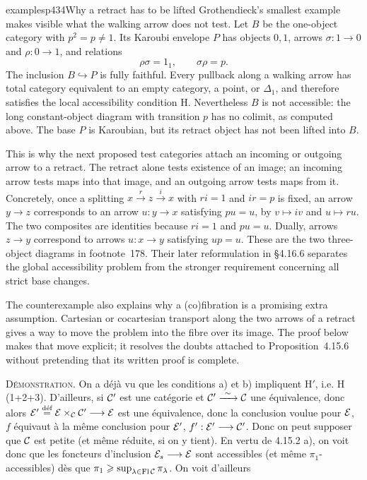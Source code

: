 \begin{dcomment}{examples}{p434}{Why a retract has to be lifted}
Grothendieck's smallest example makes visible what the walking arrow does not test. Let $B$ be the one-object category with $p^2=p\ne1$. Its Karoubi envelope $P$ has objects $0,1$, arrows $\sigma:1\to0$ and $\rho:0\to1$, and relations
\[
 \rho\sigma=1_1,\qquad\sigma\rho=p.
\]
The inclusion $B\hookrightarrow P$ is fully faithful. Every pullback along a walking arrow has total category equivalent to an empty category, a point, or $\Delta_1$, and therefore satisfies the local accessibility condition H. Nevertheless $B$ is not accessible: the long constant-object diagram with transition $p$ has no colimit, as computed above. The base $P$ is Karoubian, but its retract object has not been lifted into $B$.

This is why the next proposed test categories attach an incoming or outgoing arrow to a retract. The retract alone tests existence of an image; an incoming arrow tests maps into that image, and an outgoing arrow tests maps from it. Concretely, once a splitting $x\xrightarrow{r}z\xrightarrow{i}x$ with $ri=1$ and $ir=p$ is fixed, an arrow $y\to z$ corresponds to an arrow $u:y\to x$ satisfying $pu=u$, by $v\mapsto iv$ and $u\mapsto ru$. The two composites are identities because $ri=1$ and $pu=u$. Dually, arrows $z\to y$ correspond to arrows $u:x\to y$ satisfying $up=u$. These are the two three-object diagrams in footnote~178. Their later reformulation in \S4.16.6 separates the global accessibility problem from the stronger requirement concerning all strict base changes.

The counterexample also explains why a (co)fibration is a promising extra assumption. Cartesian or cocartesian transport along the two arrows of a retract gives a way to move the problem into the fibre over its image. The proof below makes that move explicit; it resolves the doubts attached to Proposition~4.15.6 without pretending that its written proof is complete.
\end{dcomment}


\textsc{Démonstration}. On a déjà vu que les conditions a) et b) impliquent $\mathrm{H}'$, i.e. H (1+2+3). D'ailleurs, si $\mathcal{C}'$ est une catégorie et $\cC' \xrightarrow{\ \sim\ } \cC$ une équivalence, donc alors $\mathcal{E}' \overset{\text{déf}}{=} \mathcal{E} \times_{\mathcal{C}} \mathcal{C}' \longrightarrow \mathcal{E}$ est une équivalence, donc la conclusion voulue pour $\mathcal{E}$, $f$ équivaut à la même conclusion pour $\mathcal{E}'$, $f' : \mathcal{E}' \longrightarrow \mathcal{C}'$. Donc on peut supposer que $\mathcal{C}$ est petite (et même réduite, si on y tient). En vertu de 4.15.2 a), on voit donc que les foncteurs d'inclusion $\mathcal{E}_s \longrightarrow \mathcal{E}$ sont accessibles (et même $\pi_1$-accessibles) dès que $\pi_1 \geqslant \sup_{\lambda \in \operatorname{Fl} \mathcal{C}} \pi_{\lambda}$. On voit d'ailleurs

